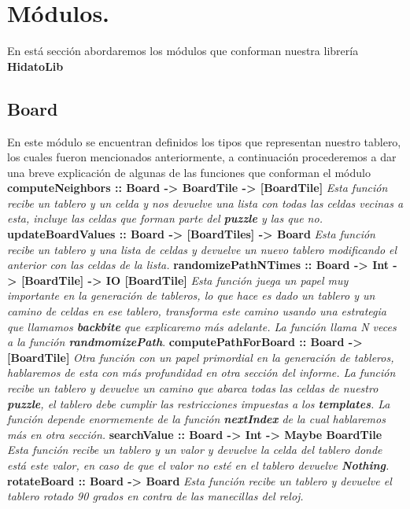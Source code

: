 \documentclass[12pt]{article}
\begin{document}
\section{M\'odulos.}
En est\'a secci\'on abordaremos los m\'odulos que conforman nuestra librer\'ia {\bf HidatoLib}
\subsection{Board}
En este m\'odulo se encuentran definidos los tipos que representan nuestro tablero, los cuales fueron mencionados anteriormente, a continuaci\'on procederemos a dar una breve
explicaci\'on de algunas de las funciones que conforman el m\'odulo
\newline \newline
{\bf computeNeighbors :: Board -> BoardTile -> [BoardTile]}\newline
{\it Esta funci\'on recibe un tablero y un celda y nos devuelve una lista con todas las celdas vecinas a esta, incluye las celdas que forman parte del {\bf puzzle} y las que no.}
\newline \newline
{\bf updateBoardValues :: Board -> [BoardTiles] -> Board}\newline
{\it Esta funci\'on recibe un tablero y una lista de celdas y devuelve un nuevo tablero modificando el anterior con las celdas de la lista.}
\newline \newline
{\bf randomizePathNTimes :: Board -> Int -> [BoardTile] -> IO [BoardTile]}\newline
{\it Esta funci\'on juega un papel muy importante en la generaci\'on de tableros, lo que hace es dado un tablero y un camino de celdas en ese tablero, transforma este camino usando una estrategia que llamamos {\bf backbite} que explicaremo
m\'as adelante. La funci\'on llama N veces a la funci\'on {\bf randmomizePath}}.
\newline \newline
{\bf computePathForBoard :: Board -> [BoardTile]}\newline
{\it Otra funci\'on con un papel primordial en la generaci\'on de tableros, hablaremos de esta con m\'as profundidad en otra secci\'on del informe. La funci\'on recibe un tablero y devuelve un camino que abarca todas las celdas de nuestro {\bf puzzle},
el tablero debe cumplir las restricciones impuestas a los {\bf templates}. La funci\'on depende enormemente de la funci\'on {\bf nextIndex} de la cual hablaremos m\'as en otra secci\'on.}
\newline \newline
{\bf searchValue :: Board -> Int -> Maybe BoardTile}\newline
{\it Esta funci\'on recibe un tablero y un valor y devuelve la celda del tablero donde est\'a este valor, en caso de que el valor no est\'e en el tablero devuelve {\bf Nothing}.}
\newline \newline
{\bf rotateBoard :: Board -> Board}\newline
{\it Esta funci\'on recibe un tablero y devuelve el tablero rotado 90 grados en contra de las manecillas del reloj.}
\end{document}
